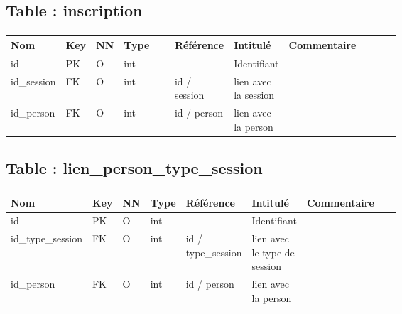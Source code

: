 	\subsection{Table : inscription}
		\paragraph{}
			\begin{tabularx}{\linewidth}{|T{0.14\linewidth}|T{0.05\linewidth}|T{0.05\linewidth}|T{0.13\linewidth}|T{0.14\linewidth}|T{0.13\linewidth}|Y|}
				\hline
				Nom & Key & NN & Type & Référence & Intitulé & Commentaire \\
				\hline
				id & PK & O & int & & Identifiant & \\
				\hline
				id\_session & FK & O & int & id / session & lien avec la session & \\
				\hline
				id\_person & FK & O & int & id / person & lien avec la person & \\
				\hline
			\end{tabularx}
			
			
	\vspace{\baselineskip}
	\subsection{Table : lien\_person\_type\_session}
		\paragraph{}
			\begin{tabularx}{\linewidth}{|T{0.2\linewidth}|T{0.05\linewidth}|T{0.05\linewidth}|T{0.06\linewidth}|T{0.15\linewidth}|T{0.13\linewidth}|Y|}
				\hline
				Nom & Key & NN & Type & Référence & Intitulé & Commentaire \\
				\hline
				id & PK & O & int & & Identifiant & \\
				\hline
				id\_type\_session & FK & O & int & id / type\_session & lien avec le type de session & \\
				\hline
				id\_person & FK & O & int & id / person & lien avec la person & \\
				\hline
			\end{tabularx}